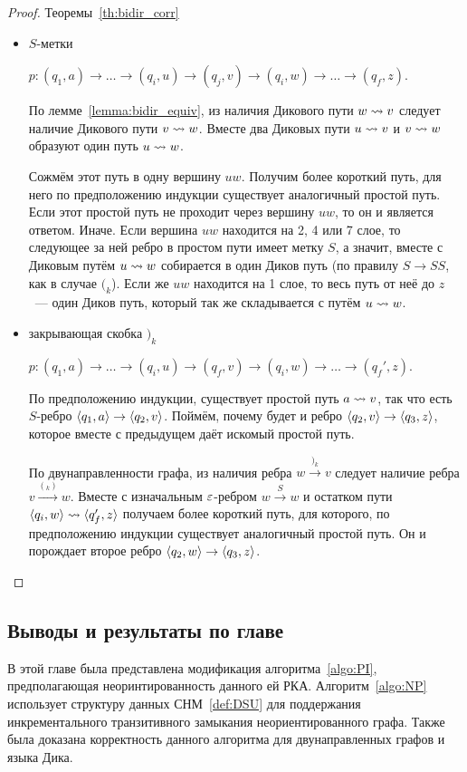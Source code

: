 \begin{proof}{Теоремы~\ref{th:bidir_corr}}
\begin{itemize}
    \item $S$-метки

      $p \colon (q_1, a) \rightarrow \dots \rightarrow (q_i, u) \rightarrow (q_j, v) \rightarrow (q_i, w) \rightarrow \dots \rightarrow (q_f, z)$.

      По лемме~\ref{lemma:bidir_equiv}, из наличия Дикового пути $w \rightsquigarrow v$ следует наличие Дикового пути $v \rightsquigarrow w$. Вместе два Диковых пути $u \rightsquigarrow v$ и $v \rightsquigarrow w$ образуют один путь $u \rightsquigarrow w$. 

      Сожмём этот путь в одну вершину $uw$. Получим более короткий путь, для него по предположению индукции существует аналогичный простой путь. Если этот простой путь не проходит через вершину $uw$, то он и является ответом. Иначе. Если вершина $uw$ находится на 2, 4 или 7 слое, то следующее за ней ребро в простом пути имеет метку $S$, а значит, вместе с Диковым путём $u \rightsquigarrow w$ собирается в один Диков путь (по правилу $S \to SS$, как в случае $(_k$). Если же $uw$ находится на 1 слое, то весь путь от неё до $z$~--- один Диков путь, который так же складывается с путём $u \rightsquigarrow w$.  

    \item закрывающая скобка $)_k$

      $p \colon (q_1, a) \rightarrow \dots \rightarrow (q_i, u) \rightarrow (q_f, v) \rightarrow (q_i, w) \rightarrow \dots \rightarrow (q_f', z)$.

      По предположению индукции, существует простой путь $a \rightsquigarrow v$, так что есть $S$-ребро $\langle q_1, a \rangle \rightarrow \langle q_2, v \rangle$. Поймём, почему будет и ребро $\langle q_2, v \rangle \rightarrow \langle q_3, z \rangle$, которое вместе с предыдущем даёт искомый простой путь.

      По двунаправленности графа, из наличия ребра $w \xrightarrow{)_k} v$ следует наличие ребра $v \xrightarrow{(_k)} w$. Вместе с изначальным $\varepsilon$-ребром $w \xrightarrow{S} w$ и остатком пути $\langle q_i, w \rangle \rightsquigarrow \langle q_f', z \rangle$ получаем более короткий путь, для которого, по предположению индукции существует аналогичный простой путь. Он и порождает второе ребро $\langle q_2, w \rangle \rightarrow \langle q_3, z \rangle$. 


  \end{itemize}

\end{proof}

\subsection{Выводы и результаты по главе}

В этой главе была представлена модификация алгоритма~\ref{algo:PI}, предполагающая неоринтированность данного ей РКА. Алгоритм~\ref{algo:NP} использует структуру данных СНМ~\ref{def:DSU} для поддержания инкрементального транзитивного замыкания неориентированного графа. Также была доказана корректность данного алгоритма для двунаправленных графов и языка Дика.

